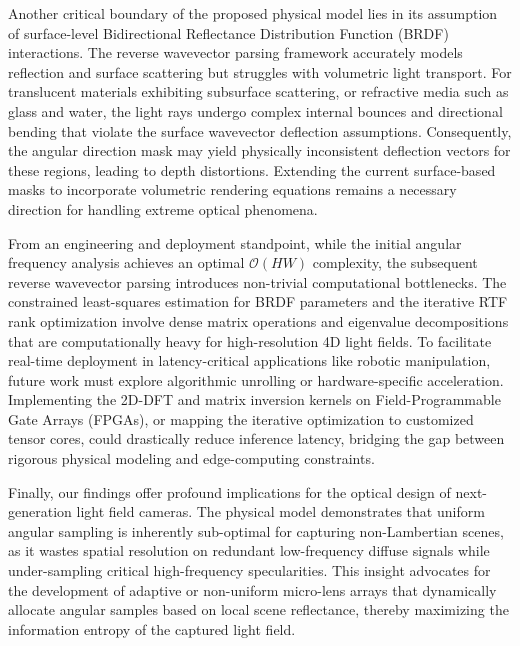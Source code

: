Another critical boundary of the proposed physical model lies in its assumption of surface-level Bidirectional Reflectance Distribution Function (BRDF) interactions. The reverse wavevector parsing framework accurately models reflection and surface scattering but struggles with volumetric light transport. For translucent materials exhibiting subsurface scattering, or refractive media such as glass and water, the light rays undergo complex internal bounces and directional bending that violate the surface wavevector deflection assumptions. Consequently, the angular direction mask may yield physically inconsistent deflection vectors for these regions, leading to depth distortions. Extending the current surface-based masks to incorporate volumetric rendering equations remains a necessary direction for handling extreme optical phenomena.

From an engineering and deployment standpoint, while the initial angular frequency analysis achieves an optimal \(\mathcal{O}(HW)\) complexity, the subsequent reverse wavevector parsing introduces non-trivial computational bottlenecks. The constrained least-squares estimation for BRDF parameters and the iterative RTF rank optimization involve dense matrix operations and eigenvalue decompositions that are computationally heavy for high-resolution 4D light fields. To facilitate real-time deployment in latency-critical applications like robotic manipulation, future work must explore algorithmic unrolling or hardware-specific acceleration. Implementing the 2D-DFT and matrix inversion kernels on Field-Programmable Gate Arrays (FPGAs), or mapping the iterative optimization to customized tensor cores, could drastically reduce inference latency, bridging the gap between rigorous physical modeling and edge-computing constraints.

Finally, our findings offer profound implications for the optical design of next-generation light field cameras. The physical model demonstrates that uniform angular sampling is inherently sub-optimal for capturing non-Lambertian scenes, as it wastes spatial resolution on redundant low-frequency diffuse signals while under-sampling critical high-frequency specularities. This insight advocates for the development of adaptive or non-uniform micro-lens arrays that dynamically allocate angular samples based on local scene reflectance, thereby maximizing the information entropy of the captured light field.


